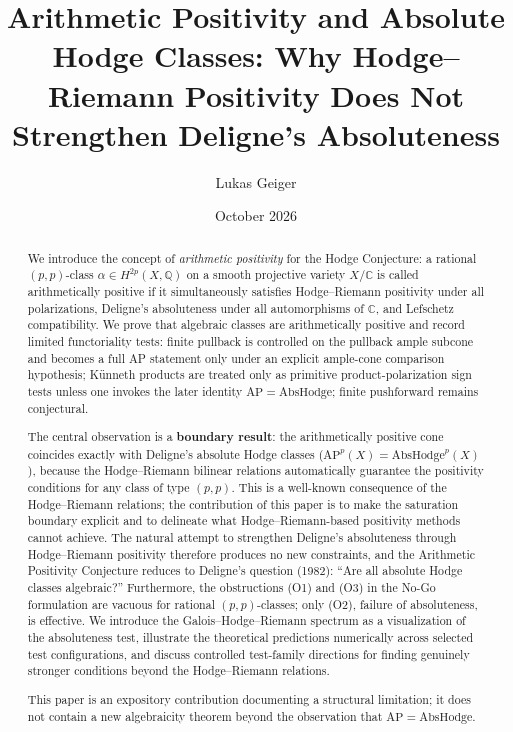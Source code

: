 \documentclass[aps,prd,twocolumn,superscriptaddress,nofootinbib]{revtex4-2}
\theoremstyle{definition}
\theoremstyle{remark}
\def\\{ }%
\begin{document}

\title{Arithmetic Positivity and Absolute Hodge Classes:\\Why Hodge--Riemann Positivity Does Not\\Strengthen Deligne's Absoluteness}

\author{Lukas Geiger}

\date{October 2026}

\begin{abstract}
We introduce the concept of \textit{arithmetic positivity} for the Hodge Conjecture: a rational $(p,p)$-class $\alpha \in H^{2p}(X, \mathbb{Q})$ on a smooth projective variety $X/\mathbb{C}$ is called arithmetically positive if it simultaneously satisfies Hodge--Riemann positivity under all polarizations, Deligne's absoluteness under all automorphisms of $\mathbb{C}$, and Lefschetz compatibility. We prove that algebraic classes are arithmetically positive and record limited functoriality tests: finite pullback is controlled on the pullback ample subcone and becomes a full AP statement only under an explicit ample-cone comparison hypothesis; Künneth products are treated only as primitive product-polarization sign tests unless one invokes the later identity $\mathrm{AP}=\mathrm{AbsHodge}$; finite pushforward remains conjectural.

The central observation is a \textbf{boundary result}: the arithmetically positive cone coincides exactly with Deligne's absolute Hodge classes ($\mathrm{AP}^p(X) = \mathrm{AbsHodge}^p(X)$), because the Hodge--Riemann bilinear relations automatically guarantee the positivity conditions for any class of type $(p,p)$. This is a well-known consequence of the Hodge--Riemann relations; the contribution of this paper is to make the saturation boundary explicit and to delineate what Hodge--Riemann-based positivity methods cannot achieve. The natural attempt to strengthen Deligne's absoluteness through Hodge--Riemann positivity therefore produces no new constraints, and the Arithmetic Positivity Conjecture reduces to Deligne's question (1982): ``Are all absolute Hodge classes algebraic?'' Furthermore, the obstructions (O1) and (O3) in the No-Go formulation are vacuous for rational $(p,p)$-classes; only (O2), failure of absoluteness, is effective. We introduce the Galois--Hodge--Riemann spectrum as a visualization of the absoluteness test, illustrate the theoretical predictions numerically across selected test configurations, and discuss controlled test-family directions for finding genuinely stronger conditions beyond the Hodge--Riemann relations.

This paper is an expository contribution documenting a structural limitation; it does not contain a new algebraicity theorem beyond the observation that $\mathrm{AP} = \mathrm{AbsHodge}$.
\end{abstract}
\end{document}
